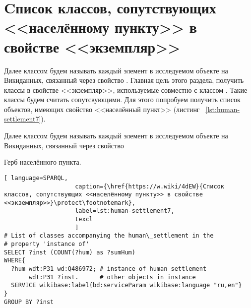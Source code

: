 \section{Cписок классов, сопутствующих <<населённому пункту>> в свойстве <<экземпляр>>}
\label{human-settlement:tag1}

Далее классом будем называть каждый элемент в исследуемом объекте на Викиданных, связанный через свойство . Главная цель этого раздела, получить классы в свойстве <<экземпляр>>, используемые совместно с классом . Такие классы будем считать сопутсвующими. Для этого попробуем получить список объектов, имеющих свойство <<населённый пункт>> (листинг ~\protect\ref{lst:human-settlement7}).

Далее классом будем называть каждый элемент в исследуемом объекте на Викиданных, связанный через свойство 

\begin{marginfigure}[0.0cm]
{
\setlength{\fboxsep}{0pt}%
\setlength{\fboxrule}{1pt}%
%
}
  \caption{Герб населённого пункта.}%
  \label{fig:flag_question_human_settlements5}%
\end{marginfigure}


\begin{lstlisting}[ language=SPARQL, 
                    caption={\href{https://w.wiki/4dEW}{Cписок классов, сопутствующих <<населённому пункту>> в свойстве <<экземпляр>>}\protect\footnotemark},
                    label=lst:human-settlement7,
                    texcl 
                    ]
# List of classes accompanying the human\_settlement in the
# property 'instance of'
SELECT ?inst (COUNT(?hum) as ?sumHum) 
WHERE{          
  ?hum wdt:P31 wd:Q486972; # instance of human settlement
       wdt:P31 ?inst.      # other objects in instance
  SERVICE wikibase:label{bd:serviceParam wikibase:language "ru,en"}
}  
GROUP BY ?inst
\end{lstlisting}%

